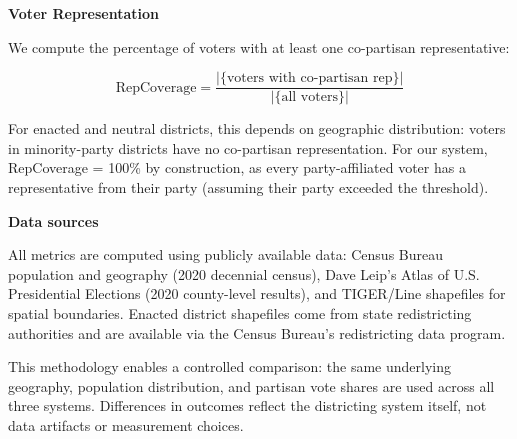 \textbf{Voter Representation}

We compute the percentage of voters with at least one co-partisan representative:

\begin{equation}
\text{RepCoverage} = \frac{|\{\text{voters with co-partisan rep}\}|}{|\{\text{all voters}\}|}
\end{equation}

For enacted and neutral districts, this depends on geographic distribution: voters in minority-party districts have no co-partisan representation. For our system, RepCoverage = 100\% by construction, as every party-affiliated voter has a representative from their party (assuming their party exceeded the threshold).

\textbf{Data sources}

All metrics are computed using publicly available data: Census Bureau population and geography (2020 decennial census), Dave Leip's Atlas of U.S. Presidential Elections (2020 county-level results), and TIGER/Line shapefiles for spatial boundaries. Enacted district shapefiles come from state redistricting authorities and are available via the Census Bureau's redistricting data program.

This methodology enables a controlled comparison: the same underlying geography, population distribution, and partisan vote shares are used across all three systems. Differences in outcomes reflect the districting system itself, not data artifacts or measurement choices.

